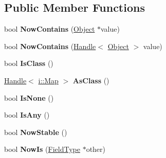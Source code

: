 \subsection*{Public Member Functions}
\begin{DoxyCompactItemize}
\item 
bool {\bfseries Now\+Contains} (\hyperlink{classv8_1_1internal_1_1_object}{Object} $\ast$value)\hypertarget{classv8_1_1internal_1_1_field_type_aa7197e39b9d0f3b63552ab7dc5052845}{}\label{classv8_1_1internal_1_1_field_type_aa7197e39b9d0f3b63552ab7dc5052845}

\item 
bool {\bfseries Now\+Contains} (\hyperlink{classv8_1_1internal_1_1_handle}{Handle}$<$ \hyperlink{classv8_1_1internal_1_1_object}{Object} $>$ value)\hypertarget{classv8_1_1internal_1_1_field_type_a4e6bff44cdf29098af2a14096c2dc875}{}\label{classv8_1_1internal_1_1_field_type_a4e6bff44cdf29098af2a14096c2dc875}

\item 
bool {\bfseries Is\+Class} ()\hypertarget{classv8_1_1internal_1_1_field_type_a3c2802808965059fa16b9aadf44cf53f}{}\label{classv8_1_1internal_1_1_field_type_a3c2802808965059fa16b9aadf44cf53f}

\item 
\hyperlink{classv8_1_1internal_1_1_handle}{Handle}$<$ \hyperlink{classv8_1_1internal_1_1_map}{i\+::\+Map} $>$ {\bfseries As\+Class} ()\hypertarget{classv8_1_1internal_1_1_field_type_acdd6a4fe6e0515625c98e47d51703606}{}\label{classv8_1_1internal_1_1_field_type_acdd6a4fe6e0515625c98e47d51703606}

\item 
bool {\bfseries Is\+None} ()\hypertarget{classv8_1_1internal_1_1_field_type_aff626052fac9f2d60cfa8b616f850a9d}{}\label{classv8_1_1internal_1_1_field_type_aff626052fac9f2d60cfa8b616f850a9d}

\item 
bool {\bfseries Is\+Any} ()\hypertarget{classv8_1_1internal_1_1_field_type_ae881505e63b5de1fd58ed7933ae9992f}{}\label{classv8_1_1internal_1_1_field_type_ae881505e63b5de1fd58ed7933ae9992f}

\item 
bool {\bfseries Now\+Stable} ()\hypertarget{classv8_1_1internal_1_1_field_type_ae99b56f32df1fac5a9c7b274313fb05d}{}\label{classv8_1_1internal_1_1_field_type_ae99b56f32df1fac5a9c7b274313fb05d}

\item 
bool {\bfseries Now\+Is} (\hyperlink{classv8_1_1internal_1_1_field_type}{Field\+Type} $\ast$other)\hypertarget{classv8_1_1internal_1_1_field_type_aa7b64b8508578dae7bf4b0b789d2f217}{}\label{classv8_1_1internal_1_1_field_type_aa7b64b8508578dae7bf4b0b789d2f217}


\end{DoxyCompactItemize}
